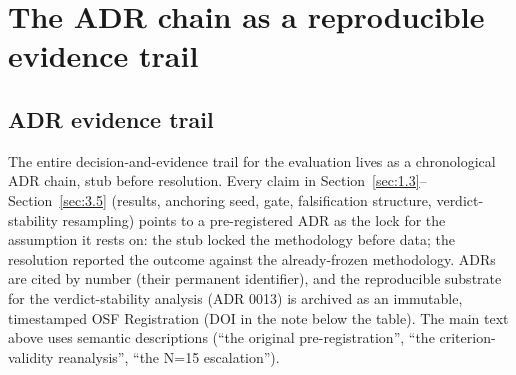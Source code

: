 \documentclass{article}
\begin{document}
\clearpage



\appendix

\section{The ADR chain as a reproducible evidence trail}
\label{app:A}

\subsection{ADR evidence trail}
\label{app:A.1}

The entire decision-and-evidence trail for the evaluation lives as a chronological ADR chain, stub before resolution. Every claim in Section~\ref{sec:1.3}--Section~\ref{sec:3.5} (results, anchoring seed, gate, falsification structure, verdict-stability resampling) points to a pre-registered ADR as the lock for the assumption it rests on: the stub locked the methodology before data; the resolution reported the outcome against the already-frozen methodology. ADRs are cited by number (their permanent identifier), and the reproducible substrate for the verdict-stability analysis (ADR 0013) is archived as an immutable, timestamped OSF Registration (DOI in the note below the table). The main text above uses semantic descriptions (``the original pre-registration'', ``the criterion-validity reanalysis'', ``the N=15 escalation'').
\end{document}
